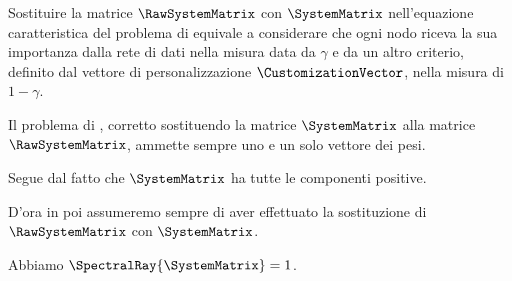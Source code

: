 \par Sostituire la matrice $\RawSystemMatrix$ con $\SystemMatrix$ nell'equazione caratteristica del problema di \PageRank equivale a considerare che ogni nodo riceva la sua importanza dalla rete di dati nella misura data da $\gamma$ e da un altro criterio, definito dal vettore di personalizzazione $\CustomizationVector$, nella misura di $1 - \gamma$.
\begin{Theorem}
	Il problema di \PageRank, corretto sostituendo la matrice $\SystemMatrix$ alla matrice $\RawSystemMatrix$, ammette sempre uno e un solo vettore dei pesi.
\end{Theorem}
\Proof Segue dal fatto che $\SystemMatrix$ ha tutte le componenti positive. \EndProof
\par D'ora in poi assumeremo sempre di aver effettuato la sostituzione di $\RawSystemMatrix$ con $\SystemMatrix$.
\begin{Theorem}
	Abbiamo $\SpectralRay{\SystemMatrix} = 1$.
\end{Theorem}
\Proof

